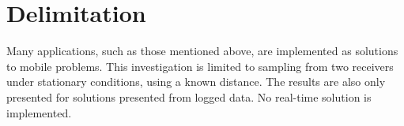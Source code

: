 \section{Delimitation}
Many applications, such as those mentioned above, are implemented as solutions to mobile problems. This investigation is limited to sampling from two receivers under stationary conditions, using a known distance. The results are also only presented for solutions presented from logged data. No real-time solution is implemented.

